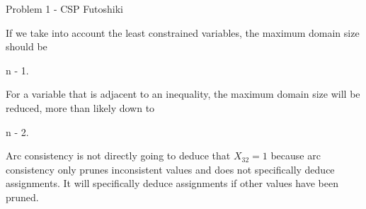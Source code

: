 \begin{problem}{Problem 1 - CSP Futoshiki}
    \begin{highlight}
        If we take into account the least constrained variables, the maximum domain size should be

        \begin{center}
            \begin{highlightbox}
                n - 1.
            \end{highlightbox}
        \end{center}
    \end{highlight}

    \begin{highlight}
        For a variable that is adjacent to an inequality, the maximum domain size will be reduced, more than likely down to 

        \begin{center}
            \begin{highlightbox}
                n - 2.
            \end{highlightbox}
        \end{center}
    \end{highlight}

    \begin{highlight}
        Arc consistency is not directly going to deduce that $X_{32} = 1$ because arc consistency only prunes inconsistent values and does not specifically deduce assignments. It will specifically
        deduce assignments if other values have been pruned.
    \end{highlight}
\end{problem}

